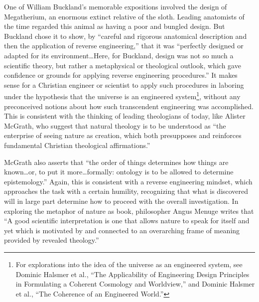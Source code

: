 One of William Buckland’s memorable expositions involved the design of
Megatherium, an enormous extinct relative of the
sloth.\citep[][pg. 245]{roberts1999}
Leading anatomists of the time regarded this
animal as having a poor and bungled design. But Buckland chose it to
show, by ``careful and rigorous anatomical description and then the
application of reverse engineering,'' that it was ``perfectly designed or
adapted for its environment{\ldots}Here, for Buckland, design was not so much
a scientific theory, but rather a metaphysical or theological outlook,
which gave confidence or grounds for applying reverse engineering
procedures.''\citep[][pg. 248]{roberts1999}
It makes sense for a Christian
engineer or scientist to apply such procedures in laboring under the
hypothesis that the universe is an engineered
system\footnote{
For explorations into the idea of the universe as an
engineered system, see Dominic Halsmer et al., ``The Applicability of
Engineering Design Principles in Formulating a Coherent Cosmology and
Worldview,''\citep{halsmeretal2008} and Dominic Halsmer et al., ``The Coherence of an
Engineered World.''\citep{halsmeretal2009b}
}, without any preconceived notions about how
such transcendent engineering was accomplished. This is consistent with
the thinking of leading theologians of today, like Alister McGrath, who
suggest that natural theology is to be understood as ``the enterprise of
seeing nature as creation, which both presupposes and reinforces
fundamental Christian theological affirmations.''\citep[][pg. 64]{mcgrath2006}

McGrath also asserts that ``the order of things determines how things are
known{\ldots}or, to put it more{\ldots}formally: ontology is to be allowed to
determine epistemology.''\citep[][pgs. xv--xvi]{mcgrath2006} Again, this is consistent
with a reverse engineering mindset, which approaches the task with a
certain humility, recognizing that what is discovered will in large
part determine how to proceed with the overall investigation. In
exploring the metaphor of nature as book, philosopher Angus Menuge
writes that ``A good scientific interpretation is one that allows nature
to speak for itself and yet which is motivated by and connected to an
overarching frame of meaning provided by revealed
theology.''\citep[][pg. 96]{menuge2003}

